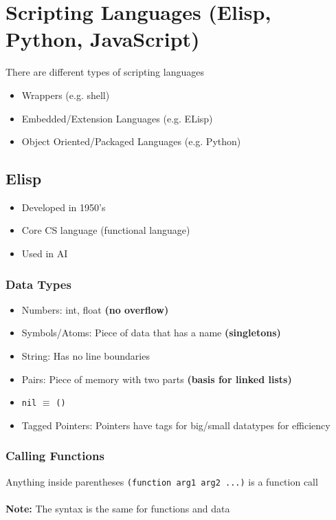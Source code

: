 \documentclass[13pt]{article}
\begin{document}
\section{Scripting Languages (Elisp, Python, JavaScript)}
There are different types of scripting languages
\begin{itemize}[leftmargin = 0pt]
\item [] Wrappers (e.g. shell)
\item [] Embedded/Extension Languages (e.g. ELisp)
\item [] Object Oriented/Packaged Languages (e.g. Python)
\end{itemize}

\subsection{Elisp}
\begin{itemize}[leftmargin = 0pt]
\item [] Developed in 1950's
\item [] Core CS language (functional language)
\item [] Used in AI
\end{itemize}

\subsubsection{Data Types}
\begin{itemize}[leftmargin = 0pt]
\item [] Numbers: int, float \textbf{(no overflow)}
\item [] Symbols/Atoms: Piece of data that has a name \textbf{(singletons)}
\item [] String: Has no line boundaries
\item [] Pairs: Piece of memory with two parts \textbf{(basis for linked lists)}
\item [] \texttt{nil} $\equiv$ \texttt{()}
\item [] Tagged Pointers: Pointers have tags for big/small datatypes for efficiency
\end{itemize}
\subsubsection{Calling Functions}
Anything inside parentheses \texttt{(function arg1 arg2 ...)} is a function call \\ \\
\textbf{Note:} The syntax is the same for functions and data
\end{document}

